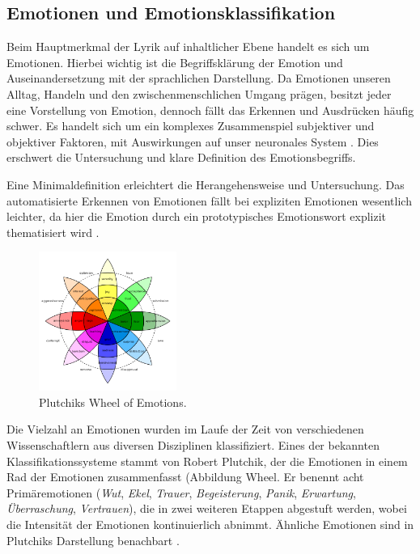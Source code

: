 \documentclass[a4paper,10p]{article}
\begin{document}
\subsection{Emotionen und Emotionsklassifikation}
Beim Hauptmerkmal der Lyrik auf inhaltlicher Ebene handelt es sich um Emotionen. Hierbei wichtig ist die Begriffsklärung der Emotion und Auseinandersetzung mit der sprachlichen Darstellung. Da Emotionen unseren Alltag, Handeln und den zwischenmenschlichen Umgang prägen, besitzt jeder eine Vorstellung von Emotion, dennoch fällt das Erkennen und Ausdrücken häufig schwer. Es handelt sich um ein komplexes Zusammenspiel subjektiver und objektiver Faktoren, mit Auswirkungen auf unser neuronales System \citep[vgl.][S. 355]{KleinginnaPaulR;Kleinginna1981}. Dies erschwert die Untersuchung und klare Definition des Emotionsbegriffs. \par 

Eine Minimaldefinition erleichtert die Herangehensweise und Untersuchung. Das automatisierte Erkennen von Emotionen fällt bei expliziten Emotionen wesentlich leichter, da hier die Emotion durch ein prototypisches Emotionswort explizit thematisiert wird \citep[vgl.][S. 34-41; S. 76-84]{Hillebrandt2011}. \par 

\begin{figure}
	\includegraphics[width=0.4\textwidth]{plutchik_wheel.png}
	\caption{Plutchiks Wheel of Emotions.}
	\label{Wheel}
\end{figure}

Die Vielzahl an Emotionen wurden im Laufe der Zeit von verschiedenen Wissenschaftlern aus diversen Disziplinen klassifiziert. Eines der bekannten Klassifikationssysteme stammt von Robert Plutchik, der die Emotionen in einem Rad der Emotionen zusammenfasst (Abbildung {Wheel}. Er benennt acht Primäremotionen (\textit{Wut}, \textit{Ekel}, \textit{Trauer}, \textit{Begeisterung}, \textit{Panik}, \textit{Erwartung}, \textit{Überraschung}, \textit{Vertrauen}), die in zwei weiteren Etappen abgestuft werden, wobei die Intensität der Emotionen kontinuierlich abnimmt. Ähnliche Emotionen sind in Plutchiks Darstellung benachbart \citep[vgl.][S. 40-122]{Plutchik}. 
\end{document}
